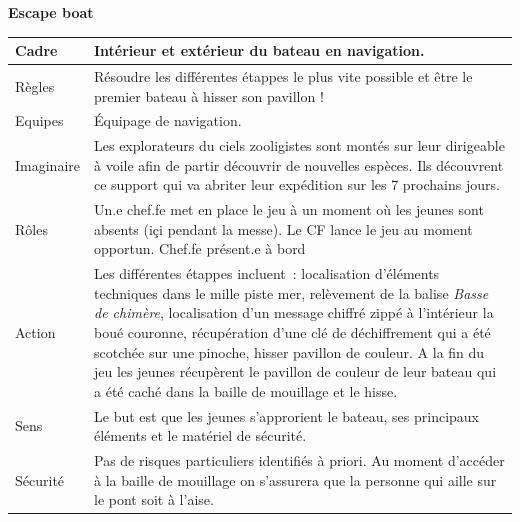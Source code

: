 
\begin{center}
{\huge \textbf{Escape boat}}\\ \vspace{0.5em}

\renewcommand{\arraystretch}{1.40}
\begin{tabular}{|C{5em}|C{25em}|}
\hline
Cadre  & Intérieur et extérieur du bateau en navigation. \\
\hline
Règles  & Résoudre les différentes étappes le plus vite possible et être le premier bateau à hisser son pavillon ! \\
\hline
Equipes & Équipage de navigation. \\
\hline
Imaginaire & Les explorateurs du ciels zooligistes sont montés sur leur dirigeable à voile afin de partir découvrir de nouvelles espèces. Ils découvrent ce support qui va abriter leur expédition sur les 7 prochains jours. \\
\hline
Rôles & 
Un.e chef.fe met en place le jeu à un moment où les jeunes sont absents (içi pendant la messe).
Le CF lance le jeu au moment opportun. Chef.fe présent.e à bord\\
\hline
Action & Les différentes étappes incluent~:  localisation d'éléments techniques dans le mille piste mer, relèvement de la balise \textit{Basse de chimère}, localisation d'un message chiffré zippé à l'intérieur la boué couronne, récupération d'une clé de déchiffrement qui a été scotchée sur une pinoche, hisser pavillon de couleur. A la fin du jeu les jeunes récupèrent le pavillon de couleur de leur bateau qui a été caché dans la baille de mouillage et le hisse. 
\\
\hline
Sens & Le but est que les jeunes s'approrient le bateau, ses principaux éléments et le matériel de sécurité. \\
\hline
Sécurité & Pas de risques particuliers identifiés à priori. Au moment d'accéder à la baille de mouillage on s'assurera que la personne qui aille sur le pont soit à l'aise.\\
\hline
\end{tabular}
\end{center}

\vspace{1cm}
